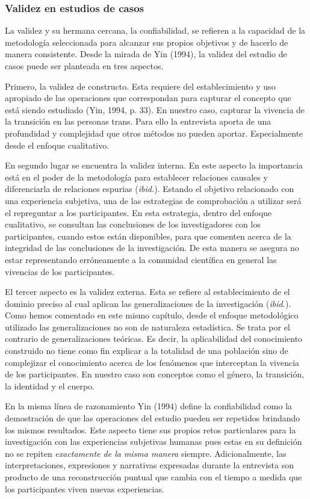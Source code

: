     \subsubsection{Validez en estudios de casos}
La validez y su hermana cercana, la confiabilidad, se refieren a la capacidad
de la metodología seleccionada para alcanzar sus propios objetivos y de
hacerlo de manera consistente.
Desde la mirada de Yin (1994), la validez del estudio de casos puede ser
planteada en tres aspectos.

Primero, la validez de constructo.
Esta requiere del establecimiento y uso apropiado de las operaciones que
correspondan para capturar el concepto que está siendo estudiado (Yin, 1994, p.
33).
En nuestro caso, capturar la vivencia de la transición en las personas trans.
Para ello la entrevista aporta de una profundidad y complejidad que otros
métodos no pueden aportar.
Especialmente desde el enfoque cualitativo.

En segundo lugar se encuentra la validez interna.
En este aspecto la importancia está en el poder de la metodología para
establecer relaciones causales y diferenciarla de relaciones espurias
(\emph{ibid.}).
Estando el objetivo relacionado con una experiencia subjetiva, una de las
estrategias de comprobación a utilizar será el repreguntar a los participantes.
En esta estrategia, dentro del enfoque cualitativo, se consultan las
conclusiones de los investigadores con los participantes, cuando estos están
disponibles, para que comenten acerca de la integridad de las conclusiones de
la investigación.
De esta manera se asegura no estar representando erróneamente a la comunidad
científica en general las vivencias de los participantes.

El tercer aspecto es la validez externa.
Esta se refiere al establecimiento de el dominio preciso al cual aplican las
generalizaciones de la investigación (\emph{ibid.}).
Como hemos comentado en este mismo capítulo, desde el enfoque metodológico
utilizado las generalizaciones no son de naturaleza estadística.
Se trata por el contrario de generalizaciones teóricas.
Es decir, la aplicabilidad del conocimiento construido no tiene como fin
explicar a la totalidad de una población sino de complejizar el conocimiento
acerca de los fenómenos que interceptan la vivencia de los participantes.
En nuestro caso son conceptos como el género, la transición, la identidad y el
cuerpo.

En la misma línea de razonamiento Yin (1994) define la confiabilidad como la
demostración de que las operaciones del estudio pueden ser repetidos
brindando los mismos resultados.
Este aspecto tiene sus propios retos particulares para la investigación con
las experiencias subjetivas humanas pues estas en su definición no se repiten
\emph{exactamente de la misma manera} siempre.
Adicionalmente, las interpretaciones, expresiones y narrativas expresadas
durante la entrevista son producto de una reconstrucción puntual que cambia
con el tiempo a medida que los participantes viven nuevas experiencias.

